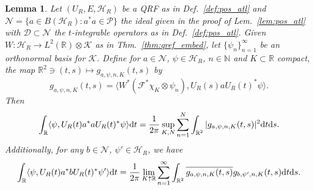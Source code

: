 \documentclass[sn-mathphys-num]{sn-jnl}%
\newcommand{\RR}{\mathbb{R}}
\newcommand{\HH}{\mathcal{H}}
\newcommand{\KK}{\mathcal{K}}
\newcommand{\diff}{\textup{d}}
\numberwithin{equation}{section}
\theoremstyle{thmstyleone}%
\newtheorem{lemma}[theorem]{Lemma}
\theoremstyle{thmstyletwo}%
\theoremstyle{thmstylethree}%
\begin{document}
\begin{lemma}
    \label{lem:time_trace_completeness}
    Let $(U_R,E,\HH_R)$ be a QRF as in Def.\ \ref{def:pos_atl} and $\mathcal{N}=\{a\in B(\HH_R):a^*a\in\mathcal{P}\}$ the ideal given in the proof of Lem.\ \ref{lem:pos_atl} with $\mathcal{D}\subset\mathcal{N}$ the $t$-integrable operators as in Def.\ \ref{def:pos_atl}. Given $W:\HH_R\to L^2(\RR)\otimes\KK$ as in Thm.\ \ref{thm:qref_embed}, let $\{\psi_n\}_{n=1}^\infty$ be an orthonormal basis for $\KK$. Define for $a\in\mathcal{N}$, $\psi\in\HH_R$, $n\in\mathbb{N}$ and $K\subset\RR$ compact, the map $\RR^2\ni(t,s)\mapsto g_{a,\psi,n,K}(t,s)$ by
        \begin{equation}
            g_{a,\psi,n,K}(t,s)=\langle W^*(\mathcal{F}^*\chi_K\otimes \psi_n),U_R(s)a U_R(t)^*\psi\rangle.
        \end{equation}
        Then
        \begin{equation}
            \int_\RR\langle \psi, U_R(t)a^*a U_R(t)^*\psi\rangle\diff t =\frac{1}{2\pi}\sup_{K,N}\sum_{n=1}^N\int_{\RR^2}\vert g_{a,\psi,n,K}(t,s)\vert^2\diff t\diff s.
        \end{equation}
        Additionally, for any $b\in \mathcal{N}$, $\psi'\in \HH_R$, we have
        \begin{equation}
            \label{eq:time_trace_completeness}
            \int_\RR\langle \psi, U_R(t)a^*b U_R(t)^*\psi'\rangle\diff t =\frac{1}{2\pi}\lim_{K\uparrow\RR}\sum_{n=1}^\infty\int_{\RR^2}\overline{g_{a,\psi,n,K}(t,s)}g_{b,\psi',n,K}(t,s)\diff t\diff s.
        \end{equation}
\end{lemma}
\end{document}

